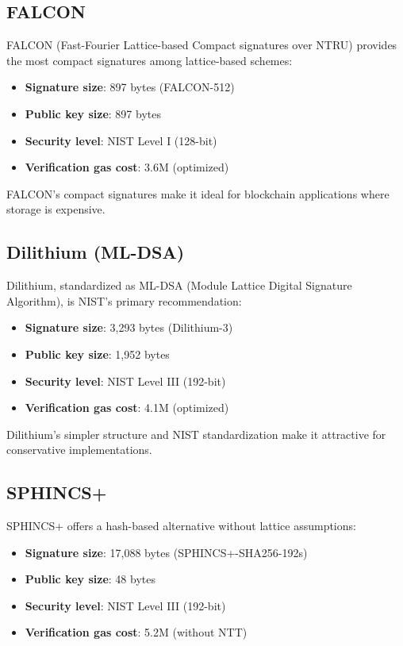 \documentclass[11pt,a4paper]{article}
\begin{document}
\subsection{FALCON}

FALCON (Fast-Fourier Lattice-based Compact signatures over NTRU) provides the most compact signatures among lattice-based schemes:

\begin{itemize}
\item \textbf{Signature size}: 897 bytes (FALCON-512)
\item \textbf{Public key size}: 897 bytes
\item \textbf{Security level}: NIST Level I (128-bit)
\item \textbf{Verification gas cost}: 3.6M (optimized)
\end{itemize}

FALCON's compact signatures make it ideal for blockchain applications where storage is expensive.

\subsection{Dilithium (ML-DSA)}

Dilithium, standardized as ML-DSA (Module Lattice Digital Signature Algorithm), is NIST's primary recommendation:

\begin{itemize}
\item \textbf{Signature size}: 3,293 bytes (Dilithium-3)
\item \textbf{Public key size}: 1,952 bytes
\item \textbf{Security level}: NIST Level III (192-bit)
\item \textbf{Verification gas cost}: 4.1M (optimized)
\end{itemize}

Dilithium's simpler structure and NIST standardization make it attractive for conservative implementations.

\subsection{SPHINCS+}

SPHINCS+ offers a hash-based alternative without lattice assumptions:

\begin{itemize}
\item \textbf{Signature size}: 17,088 bytes (SPHINCS+-SHA256-192s)
\item \textbf{Public key size}: 48 bytes
\item \textbf{Security level}: NIST Level III (192-bit)
\item \textbf{Verification gas cost}: 5.2M (without NTT)
\end{itemize}
\end{document}
